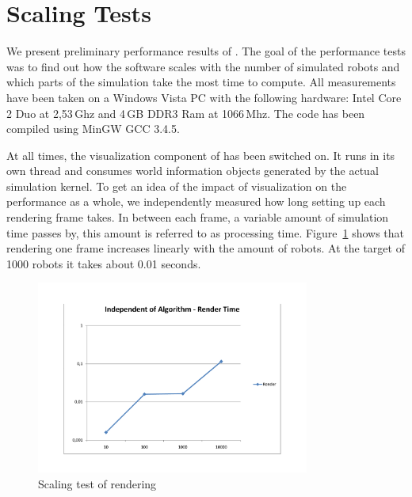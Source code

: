
\section{Scaling Tests}

We present preliminary performance results of \RSS. The goal of the performance tests was to find out how the software scales with the number of simulated robots and which parts of the simulation take the most time to compute. All measurements have been taken on a Windows Vista PC with the following hardware: Intel Core 2 Duo at 2,53\,Ghz and 4\,GB DDR3 Ram at 1066\,Mhz. The code has been compiled using {\sffamily MinGW GCC 3.4.5}.

At all times, the visualization component of \RSS has been switched on. It runs in its own thread and consumes world information objects generated by the actual simulation kernel. To get an idea of the impact of visualization on the performance as a whole, we independently measured how long setting up each rendering frame takes. In between each frame, a variable amount of simulation time passes by, this amount is referred to as processing time. Figure~\ref{pic:scaling:render} shows that rendering one frame increases linearly with the amount of robots. At the target of 1000 robots it takes about 0.01 seconds. 

\begin{figure}[p]
	\begin{center}
	\includegraphics[width=0.8\textwidth]{scaling-render}
	\caption{Scaling test of rendering}
	\label{pic:scaling:render}
	\end{center}
\end{figure}

